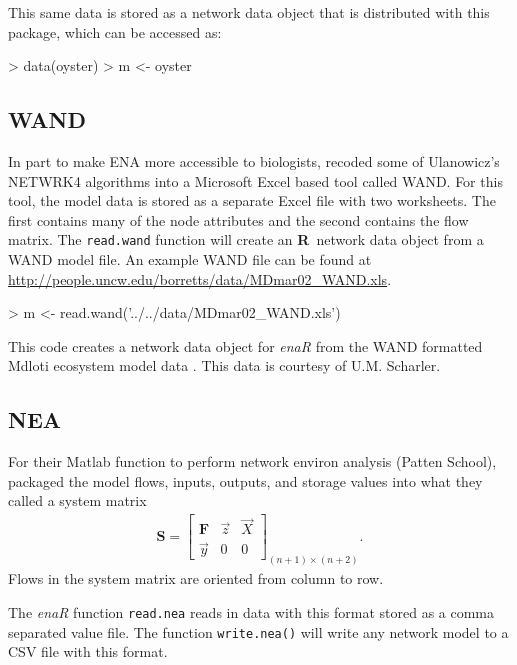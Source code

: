 \documentclass[article]{jss}
\newcommand{\R}{\textbf{R}}
\begin{document}
This same data is stored as a network data object that is distributed
with this package, which can be accessed as:
\begin{Schunk}
\begin{Sinput}
> data(oyster)
> m <- oyster
\end{Sinput}
\end{Schunk}

\subsection*{WAND}
In part to make ENA more accessible to biologists,
\citet{allesina04_wand} recoded some of Ulanowicz's NETWRK4 algorithms
into a Microsoft Excel based tool called WAND.  For this tool, the
model data is stored as a separate Excel file with two worksheets.
The first contains many of the node attributes and the second contains the
flow matrix.  The \texttt{read.wand} function will create an \R\
network data object from a WAND model file. An example WAND file can
be found at \url{http://people.uncw.edu/borretts/data/MDmar02_WAND.xls}.

\begin{Schunk}
\begin{Sinput}
> m <- read.wand('../../data/MDmar02_WAND.xls')
\end{Sinput}
\end{Schunk}

This code creates a network data object for \textit{enaR} from the WAND
formatted Mdloti ecosystem model data
\citep{scharler2012ecosystem}. This data is courtesy of U.M. Scharler.

\subsection*{NEA}

For their Matlab function to perform network environ analysis (Patten School),
\citet{fath06} packaged the model flows, inputs, outputs, and storage
values into what they called a system matrix
\begin{align}
\mathbf{S} = \left[ \begin{array}{ccc} \mathbf{F} & \vec{z} & \vec{X} \\
     \vec{y}  &  0 & 0 \end{array}
\right]_{(n+1) \times (n+2)}.
\end{align}
Flows in the system matrix are oriented from column to row.

The \textit{enaR} function \texttt{read.nea} reads in data with this
format stored as a comma separated value file.  The function
\texttt{write.nea()} will write any network model to a CSV file with
this format.
\end{document}
